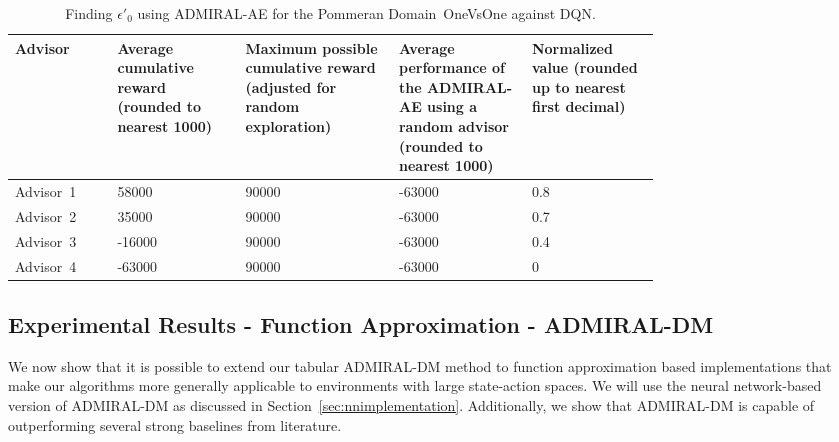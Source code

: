 \documentclass[jair, twoside,11pt,theapa]{article}
\begin{document}
\begin{table}[h]
\begin{center}
 \begin{tabular}{||p{0.12 \linewidth} |p{0.15 \linewidth} |p{0.18 \linewidth} |p{0.15 \linewidth} | p{0.15 \linewidth}||} 
 \hline
 Advisor & Average cumulative reward (rounded to nearest 1000) & Maximum possible cumulative reward (adjusted for random exploration) & Average performance of the  ADMIRAL-AE using a random advisor (rounded to nearest 1000) & Normalized value (rounded up to nearest first decimal)\\ [0.5ex]
 \hline\hline
 Advisor~1 & 58000 & 90000 & -63000 & 0.8 \\ 
 \hline
 Advisor~2 & 35000 & 90000 & -63000 & 0.7  \\
 \hline
 Advisor~3 & -16000 & 90000 & -63000 & 0.4 \\
 \hline
 Advisor~4 & -63000  & 90000 & -63000 & 0  \\[1ex] 
 \hline
\end{tabular}
\caption{Finding $\epsilon'_0$ using ADMIRAL-AE for the Pommeran Domain~OneVsOne against DQN.}
\label{tab:pommermanvsdqnepsilon}
\end{center}
\end{table}



\subsection{Experimental Results - Function Approximation - ADMIRAL-DM}\label{sec:experiments}


 We now show that it is possible to extend our tabular ADMIRAL-DM method to function approximation based implementations that make our algorithms more generally applicable to environments with large state-action spaces. We will use the neural network-based version of ADMIRAL-DM as discussed in Section~\ref{sec:nnimplementation}. Additionally, we show that ADMIRAL-DM is capable of outperforming several strong baselines from literature.    
\end{document}
